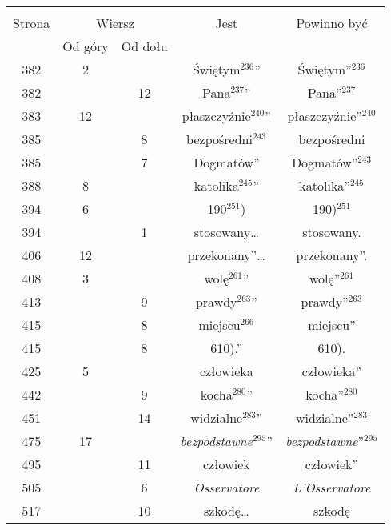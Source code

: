 \documentclass[a4paper,11pt]{article}
\begin{document}
\begin{center}
  \begin{tabular}{|c|c|c|c|c|}
    \hline
    & \multicolumn{2}{c|}{} & & \\
    Strona & \multicolumn{2}{c|}{Wiersz} & Jest
                              & Powinno być \\ \cline{2-3}
    & Od góry & Od dołu & & \\
    \hline
    382 &  2 & & Świętym$^{ 236 }$” & Świętym”$^{ 236 }$ \\
    382 & & 12 & Pana$^{ 237 }$” & Pana”$^{ 237 }$ \\
    383 & 12 & & płaszczyźnie$^{ 240 }$” & płaszczyźnie”$^{ 240 }$ \\
    385 & &  8 & bezpośredni$^{ 243 }$ & bezpośredni \\
    385 & &  7 & Dogmatów” & Dogmatów”$^{ 243 }$ \\
    388 &  8 & & katolika$^{ 245 }$” & katolika”$^{ 245 }$ \\
    394 &  6 & & 190$^{ 251 }$) & 190)$^{ 251 }$ \\
    394 & &  1 & stosowany\ldots & stosowany. \\
    406 & 12 & & przekonany”\ldots & przekonany”. \\
    408 &  3 & & wolę$^{ 261 }$” & wolę”$^{ 261 }$ \\
    413 & &  9 & prawdy$^{ 263 }$” & prawdy”$^{ 263 }$ \\
    415 & &  8 & miejscu$^{ 266 }$ & miejscu” \\
    415 & &  8 & 610).” & 610). \\
    425 &  5 & & człowieka & człowieka” \\
    442 & &  9 & kocha$^{ 280 }$” & kocha”$^{ 280 }$ \\
    451 & & 14 & widzialne$^{ 283 }$” & widzialne”$^{ 283 }$ \\
    475 & 17 & & \emph{bezpodstawne}$^{ 295 }$”
           & \emph{bezpodstawne}”$^{ 295 }$ \\
    495 & & 11 & człowiek & człowiek” \\
    505 & &  6 & \emph{Osservatore} & \emph{L'Osservatore} \\
    517 & & 10 & szkodę\ldots & szkodę \\
    \hline
  \end{tabular}

\end{center}
\end{document}
